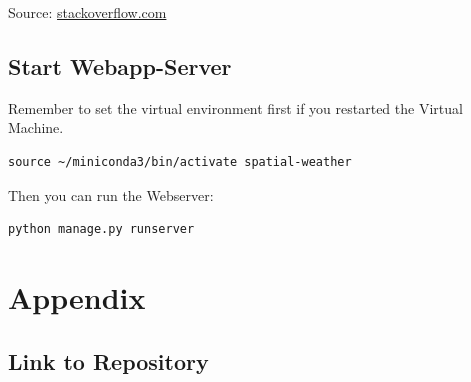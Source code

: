 \documentclass[paper=a4, fontsize=11pt]{scrartcl} %
\numberwithin{equation}{section} %
\numberwithin{figure}{section} %
\numberwithin{table}{section} %
\begin{document}
Source:
\href{http://stackoverflow.com/questions/11365619/psycopg2-installation-error-library-not-loaded-libssl-dylib}{stackoverflow.com}


\subsection{Start Webapp-Server}
Remember to set the virtual environment first if you restarted the Virtual Machine.
\begin{lstlisting}
source ~/miniconda3/bin/activate spatial-weather
\end{lstlisting}
Then you can run the Webserver:
\begin{lstlisting}
python manage.py runserver
\end{lstlisting}

\section{Appendix}
\subsection{Link to Repository}
\end{document}
